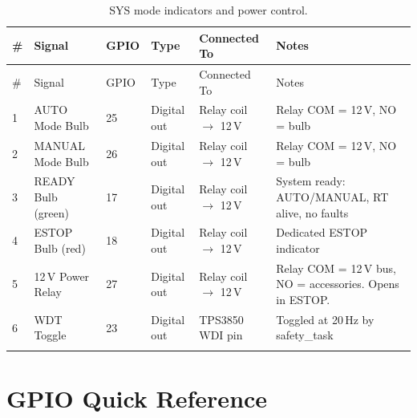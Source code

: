 \documentclass[12pt,a4paper,oneside]{report}
\begin{document}
\begin{center}
\begin{longtable}{p{4mm} p{28mm} p{8mm} p{18mm} p{30mm} p{48mm}}
\toprule
\# & Signal & GPIO & Type & Connected To & Notes \\
\midrule
\endfirsthead
\toprule
\# & Signal & GPIO & Type & Connected To & Notes \\
\midrule
\endhead
1 & AUTO Mode Bulb   & 25 & Digital out & Relay coil $\rightarrow$ 12\,V & Relay COM = 12\,V, NO = bulb \\
2 & MANUAL Mode Bulb  & 26 & Digital out & Relay coil $\rightarrow$ 12\,V & Relay COM = 12\,V, NO = bulb \\
3 & READY Bulb (green)& 17 & Digital out & Relay coil $\rightarrow$ 12\,V & System ready: AUTO/MANUAL, RT alive, no faults \\
4 & ESTOP Bulb (red)  & 18 & Digital out & Relay coil $\rightarrow$ 12\,V & Dedicated ESTOP indicator \\
5 & 12\,V Power Relay & 27 & Digital out & Relay coil $\rightarrow$ 12\,V & Relay COM = 12\,V bus, NO = accessories. Opens in ESTOP. \\
6 & WDT Toggle        & 23 & Digital out & TPS3850 WDI pin        & Toggled at 20\,Hz by safety\_task \\
\bottomrule
\caption{SYS mode indicators and power control.}
\end{longtable}
\end{center}

\section{GPIO Quick Reference}
\end{document}
